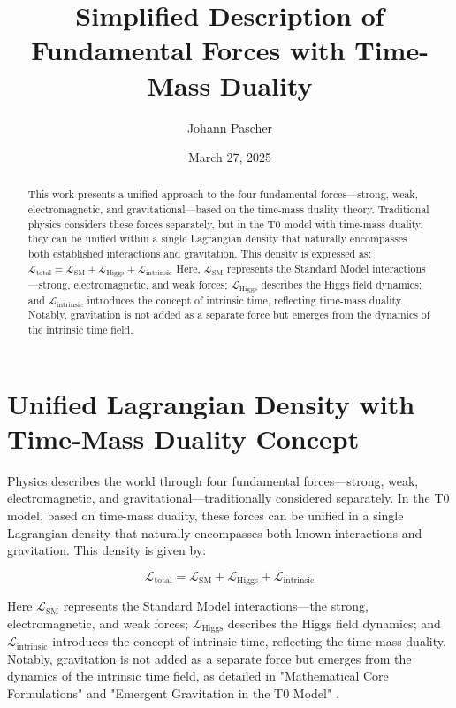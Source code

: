 \documentclass[a4paper,12pt]{article}
\title{Simplified Description of Fundamental Forces with Time-Mass Duality}
\author{Johann Pascher}
\date{March 27, 2025}
\begin{document}
	
	\maketitle
	
	\begin{abstract}
		This work presents a unified approach to the four fundamental forces—strong, weak, electromagnetic, and gravitational—based on the time-mass duality theory. Traditional physics considers these forces separately, but in the T0 model with time-mass duality, they can be unified within a single Lagrangian density that naturally encompasses both established interactions and gravitation. This density is expressed as:
		$\mathcal{L}_\text{total} = \mathcal{L}_\text{SM} + \mathcal{L}_\text{Higgs} + \mathcal{L}_\text{intrinsic}$
		Here, $\mathcal{L}_\text{SM}$ represents the Standard Model interactions—strong, electromagnetic, and weak forces; $\mathcal{L}_\text{Higgs}$ describes the Higgs field dynamics; and $\mathcal{L}_\text{intrinsic}$ introduces the concept of intrinsic time, reflecting time-mass duality. Notably, gravitation is not added as a separate force but emerges from the dynamics of the intrinsic time field.
	\end{abstract}
	
	\tableofcontents
	\newpage
	
	\section{Unified Lagrangian Density with Time-Mass Duality Concept}
	
	Physics describes the world through four fundamental forces—strong, weak, electromagnetic, and gravitational—traditionally considered separately. In the T0 model, based on time-mass duality, these forces can be unified in a single Lagrangian density that naturally encompasses both known interactions and gravitation. This density is given by:
	
	\begin{equation}
		\mathcal{L}_\text{total} = \mathcal{L}_\text{SM} + \mathcal{L}_\text{Higgs} + \mathcal{L}_\text{intrinsic}
	\end{equation}
	
	Here $\mathcal{L}_\text{SM}$ represents the Standard Model interactions—the strong, electromagnetic, and weak forces; $\mathcal{L}_\text{Higgs}$ describes the Higgs field dynamics; and $\mathcal{L}_\text{intrinsic}$ introduces the concept of intrinsic time, reflecting the time-mass duality. Notably, gravitation is not added as a separate force but emerges from the dynamics of the intrinsic time field, as detailed in "Mathematical Core Formulations" \cite{pascher_lagrange_2025} and "Emergent Gravitation in the T0 Model" \cite{pascher_emergente_gravitation_2025}.
	
\end{document}
